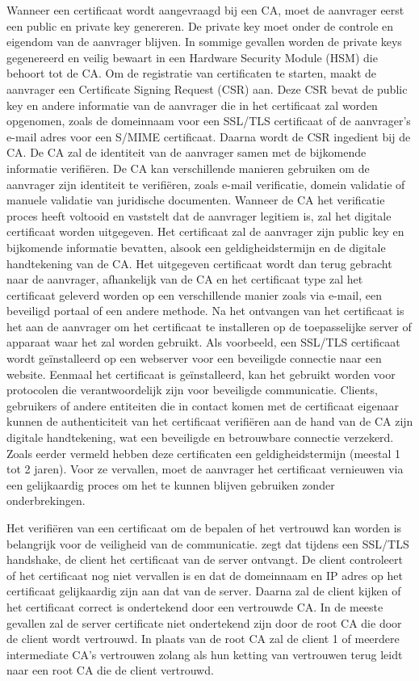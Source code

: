 Wanneer een certificaat wordt aangevraagd bij een CA, moet de aanvrager eerst een public en private key genereren. De private key moet onder de controle en eigendom van de aanvrager blijven. In sommige gevallen worden de private keys gegenereerd en veilig bewaart in een Hardware Security Module (HSM) die behoort tot de CA. \autocite{SSLcom}
Om de registratie van certificaten te starten, maakt de aanvrager een Certificate Signing Request (CSR) aan. Deze CSR bevat de public key en andere informatie van de aanvrager die in het certificaat zal worden opgenomen, zoals de domeinnaam voor een SSL/TLS certificaat of de aanvrager's e-mail adres voor een S/MIME certificaat.
Daarna wordt de CSR ingedient bij de CA. De CA zal de identiteit van de aanvrager samen met de bijkomende informatie verifiëren. De CA kan verschillende manieren gebruiken om de aanvrager zijn identiteit te verifiëren, zoals e-mail verificatie, domein validatie of manuele validatie van juridische documenten.
Wanneer de CA het verificatie proces heeft voltooid en vaststelt dat de aanvrager legitiem is, zal het digitale certificaat worden uitgegeven. Het certificaat zal de aanvrager zijn public key en bijkomende informatie bevatten, alsook een geldigheidstermijn en de digitale handtekening van de CA.
Het uitgegeven certificaat wordt dan terug gebracht naar de aanvrager, afhankelijk van de CA en het certificaat type zal het certificaat geleverd worden op een verschillende manier zoals via e-mail, een beveiligd portaal of een andere methode.
Na het ontvangen van het certificaat is het aan de aanvrager om het certificaat te installeren op de toepasselijke server of apparaat waar het zal worden gebruikt. Als voorbeeld, een SSL/TLS certificaat wordt geïnstalleerd op een webserver voor een beveiligde connectie naar een website.
Eenmaal het certificaat is geïnstalleerd, kan het gebruikt worden voor protocolen die verantwoordelijk zijn voor beveiligde communicatie. Clients, gebruikers of andere entiteiten die in contact komen met de certificaat eigenaar kunnen de authenticiteit van het certificaat verifiëren aan de hand van de CA zijn digitale handtekening, wat een beveiligde en betrouwbare connectie verzekerd.
Zoals eerder vermeld hebben deze certificaten een geldigheidstermijn (meestal 1 tot 2 jaren). Voor ze vervallen, moet de aanvrager het certificaat vernieuwen via een gelijkaardig proces om het te kunnen blijven gebruiken zonder onderbrekingen. \autocite{EncCon} \break

Het verifiëren van een certificaat om de bepalen of het vertrouwd kan worden is belangrijk voor de veiligheid van de communicatie.
\Textcite{okta} zegt dat tijdens een SSL/TLS handshake, de client het certificaat van de server ontvangt. De client controleert of het certificaat nog niet vervallen is en dat de domeinnaam en IP adres op het certificaat gelijkaardig zijn aan dat van de server. Daarna zal de client kijken of het certificaat correct is ondertekend door een vertrouwde CA.
In de meeste gevallen zal de server certificate niet ondertekend zijn door de root CA die door de client wordt vertrouwd. In plaats van de root CA zal de client 1 of meerdere intermediate CA's vertrouwen zolang als hun ketting van vertrouwen terug leidt naar een root CA die de client vertrouwd.

